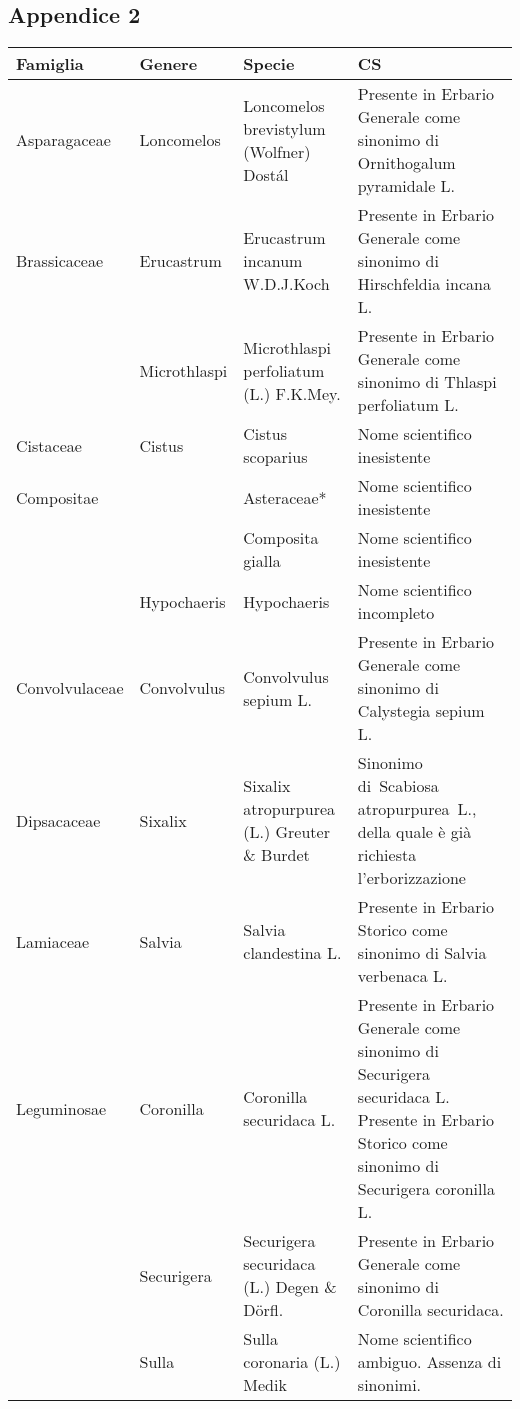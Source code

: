 \documentclass[main.tex]{subfiles}
\begin{document}
\subsection{Appendice 2}

\begin{table}[!ht]
    \centering
    \begin{tabular}[\footnotesize]{|l|l|p{5cm}|p{5.5cm}|}
    \hline
        \textbf{Famiglia} & \textbf{Genere} & \textbf{Specie} & \textbf{CS} \\ \hline
        Asparagaceae & Loncomelos & Loncomelos brevistylum (Wolfner) Dostál & Presente in Erbario Generale come sinonimo di Ornithogalum pyramidale L. \\ \hline
        Brassicaceae & Erucastrum  & Erucastrum incanum W.D.J.Koch & Presente in Erbario Generale come sinonimo di Hirschfeldia incana L. \\ \hline
        ~ & Microthlaspi & Microthlaspi perfoliatum (L.) F.K.Mey. & Presente in Erbario Generale come sinonimo di Thlaspi perfoliatum L. \\ \hline
        Cistaceae & Cistus & Cistus scoparius & Nome scientifico inesistente \\ \hline
        Compositae & ~ & Asteraceae* & Nome scientifico inesistente \\ \hline
        ~ & ~ & Composita gialla & Nome scientifico inesistente \\ \hline
        ~ & Hypochaeris & Hypochaeris & Nome scientifico incompleto \\ \hline
        Convolvulaceae & Convolvulus & Convolvulus sepium L. & Presente in Erbario Generale come sinonimo di Calystegia sepium L. \\ \hline
        Dipsacaceae & Sixalix & Sixalix atropurpurea (L.) Greuter \& Burdet & Sinonimo di Scabiosa atropurpurea L., della quale è già richiesta l'erborizzazione  \\ \hline
        Lamiaceae & Salvia & Salvia clandestina L. & Presente in Erbario Storico come sinonimo di Salvia verbenaca L. \\ \hline
        Leguminosae & Coronilla & Coronilla securidaca L. & Presente in Erbario Generale come sinonimo di Securigera securidaca L. Presente in Erbario Storico come sinonimo di Securigera coronilla L. \\ \hline
        ~ & Securigera & Securigera securidaca (L.) Degen \& Dörfl. & Presente in Erbario Generale come sinonimo di Coronilla securidaca.  \\ \hline
        ~ & Sulla & Sulla coronaria (L.) Medik & Nome scientifico ambiguo. Assenza di sinonimi. \\ \hline

\end{tabular}
\end{table}
\end{document}
